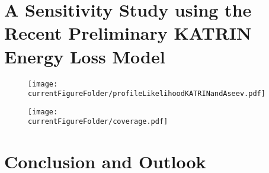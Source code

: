 

\section{A Sensitivity Study using the Recent Preliminary KATRIN Energy Loss Model}
\label{sec:katrinElossModelResults}
\def\currentRootFolder{chapter/sensitivityStudyWithPreliminaryKatrinElossModel}
\def\currentFigureFolder{\currentRootFolder/fig}
\begin{figure}[th]
	\centering
	\texttt{[image: \\currentFigureFolder/profileLikelihoodKATRINandAseev.pdf]}
	\xcaption{}{}{}
	\label{fig:katrinElossResultsProfileLikelihood}
\end{figure}

\begin{figure}[th]
	\centering
	\texttt{[image: \\currentFigureFolder/coverage.pdf]}
	\label{fig:katrinElossResultsCoverage}
\end{figure}


\section{Conclusion and Outlook}
\label{sec:katrinElossModelConclusion}
